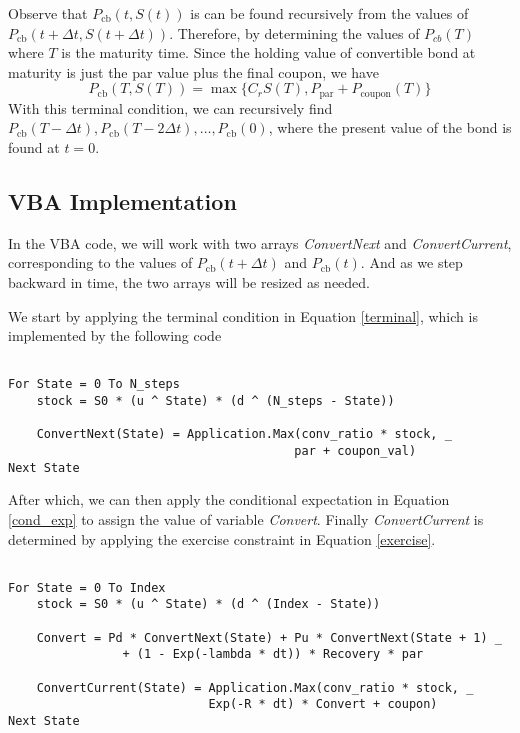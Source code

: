\documentclass[11pt]{article}
\theoremstyle{definition}
\begin{document}
Observe that $P_\text{cb}(t,S(t))$ is can be found recursively
from the values of $P_\text{cb}(t+\Delta t,S(t+\Delta t))$.
Therefore, by determining the values of $P_{cb}(T)$ 
where $T$ is the maturity time.
Since the holding value of convertible bond at maturity
is just the par value plus the final coupon, we have
%
\begin{equation}
\label{terminal}
  P_\text{cb}(T,S(T)) = \max\Big\{C_r S(T), P_\text{par} + 
                    P_\text{coupon}(T)\Big\}
\end{equation}
%
With this terminal condition, we can recursively find
$P_\text{cb}(T-\Delta t), P_\text{cb}(T- 2 \Delta t),
\ldots, P_\text{cb}(0)$,
where the present value of the bond is found at $t=0$.








\subsection{VBA Implementation} \label{ssc:vba}

In the VBA code, we will work with two arrays \emph{ConvertNext}
and \emph{ConvertCurrent}, 
corresponding to the values of $P_\text{cb}(t+\Delta t)$
and $P_\text{cb}(t)$.
And as we step backward in time, the two arrays will be resized as needed.

We start by applying the terminal condition in Equation \eqref{terminal},
which is implemented by the following code

\begin{lstlisting}[language = VBScript, caption = VBA Code for Terminal Condition]

For State = 0 To N_steps
    stock = S0 * (u ^ State) * (d ^ (N_steps - State))

    ConvertNext(State) = Application.Max(conv_ratio * stock, _
                                        par + coupon_val)
Next State

\end{lstlisting}

After which, we can then apply the conditional expectation 
in Equation \eqref{cond_exp} 
to assign the value of variable \emph{Convert}.
Finally \emph{ConvertCurrent} is determined
by applying the exercise constraint in Equation \ref{exercise}.

\begin{lstlisting}[language = VBScript, caption = VBA Code for Terminal Condition]

For State = 0 To Index
    stock = S0 * (u ^ State) * (d ^ (Index - State))

    Convert = Pd * ConvertNext(State) + Pu * ConvertNext(State + 1) _
                + (1 - Exp(-lambda * dt)) * Recovery * par

    ConvertCurrent(State) = Application.Max(conv_ratio * stock, _
                            Exp(-R * dt) * Convert + coupon)
Next State

\end{lstlisting}
\end{document}
